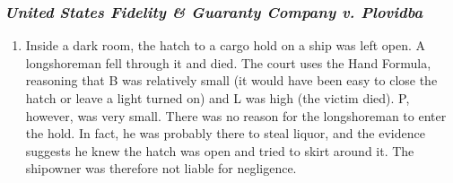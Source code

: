\subsubsection{\emph{United States Fidelity \& Guaranty Company v. Plovidba}}

\begin{enumerate}
    \item Inside a dark room, the hatch to a cargo hold on a ship was left open. A longshoreman fell through it and died. The court uses the Hand Formula, reasoning that B was relatively small (it would have been easy to close the hatch or leave a light turned on) and L was high (the victim died). P, however, was very small. There was no reason for the longshoreman to enter the hold. In fact, he was probably there to steal liquor, and the evidence suggests he knew the hatch was open and tried to skirt around it. The shipowner was therefore not liable for negligence.
\end{enumerate}
